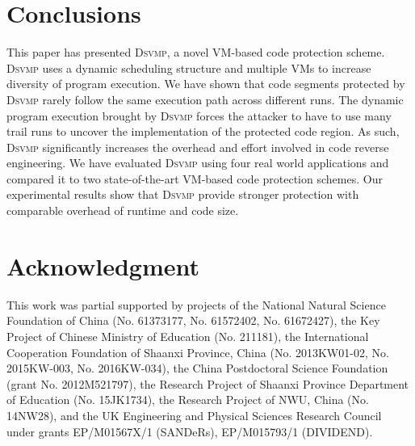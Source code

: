 \documentclass[preprint,12pt,3p]{elsarticle}
\newcommand{\DSVMP}{\textsc{Dsvmp}\xspace}
\begin{document}
\section{Conclusions}\label{sec:con}
This paper has presented \DSVMP, a novel VM-based code protection scheme.
\DSVMP uses a dynamic scheduling structure and multiple VMs to increase
diversity of program execution. We have shown that code
segments protected by \DSVMP rarely follow the same execution path across
different runs. The dynamic program execution brought by \DSVMP forces the attacker
to have to use many trail runs to uncover the implementation of the protected code
region. As such, \DSVMP significantly increases the overhead and effort
involved in code reverse engineering. We have evaluated \DSVMP using four
real world applications and compared it to two state-of-the-art VM-based code
protection schemes. Our experimental results show that \DSVMP provide
stronger protection with comparable overhead of runtime and code size.

\section*{Acknowledgment}
This work was partial supported by projects of the National Natural Science Foundation of China
(No. 61373177, No. 61572402, No. 61672427),
the Key Project of Chinese Ministry of Education (No. 211181),
the International Cooperation Foundation of Shaanxi Province, China (No. 2013KW01-02, No. 2015KW-003, No. 2016KW-034),
the China Postdoctoral Science Foundation (grant No. 2012M521797),
the Research Project of Shaanxi Province Department of Education (No. 15JK1734),
the Research Project of NWU, China (No. 14NW28),
and the UK Engineering and Physical Sciences Research Council under grants EP/M01567X/1 (SANDeRs), EP/M015793/1 (DIVIDEND).








% 
% 
% 
% 
% 
% 
% 
% 
% 
% 
% 
% 


\end{document}
